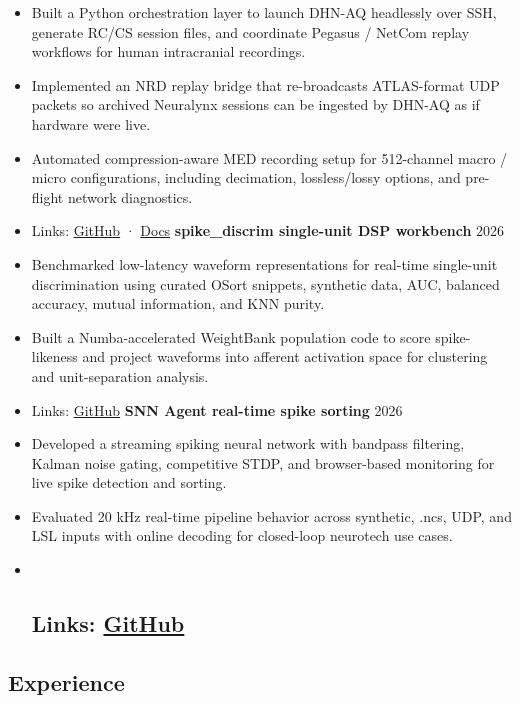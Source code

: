 \documentclass[11pt]{article}
\begin{document}
\begin{itemize}
\item
  Built a Python orchestration layer to launch DHN-AQ headlessly over
  SSH, generate RC/CS session files, and coordinate Pegasus / NetCom
  replay workflows for human intracranial recordings.
\item
  Implemented an NRD replay bridge that re-broadcasts ATLAS-format UDP
  packets so archived Neuralynx sessions can be ingested by DHN-AQ as if
  hardware were live.
\item
  Automated compression-aware MED recording setup for 512-channel macro
  / micro configurations, including decimation, lossless/lossy options,
  and pre-flight network diagnostics.
\item
  Links:
  \href{https://github.com/BarkBarkBarkBarkBarkBarkBark/dhn_client}{GitHub}
  ·
  \href{https://barkbarkbarkbarkbarkbarkbark.github.io/dhn_client/}{Docs}
  \textbf{spike\_discrim single-unit DSP workbench} \textbar{} 2026
\item
  Benchmarked low-latency waveform representations for real-time
  single-unit discrimination using curated OSort snippets, synthetic
  data, AUC, balanced accuracy, mutual information, and KNN purity.
\item
  Built a Numba-accelerated WeightBank population code to score
  spike-likeness and project waveforms into afferent activation space
  for clustering and unit-separation analysis.
\item
  Links:
  \href{https://github.com/BarkBarkBarkBarkBarkBarkBark/spike_discrim}{GitHub}
  \textbf{SNN Agent real-time spike sorting} \textbar{} 2026
\item
  Developed a streaming spiking neural network with bandpass filtering,
  Kalman noise gating, competitive STDP, and browser-based monitoring
  for live spike detection and sorting.
\item
  Evaluated 20 kHz real-time pipeline behavior across synthetic, .ncs,
  UDP, and LSL inputs with online decoding for closed-loop neurotech use
  cases.
\item ~
  \subsection{\texorpdfstring{Links:
  \href{https://github.com/BarkBarkBarkBarkBarkBarkBark/SNNeuro}{GitHub}}{Links: GitHub}}\label{links-github}
\end{itemize}

\subsection{Experience}\label{experience-1}
\end{document}
